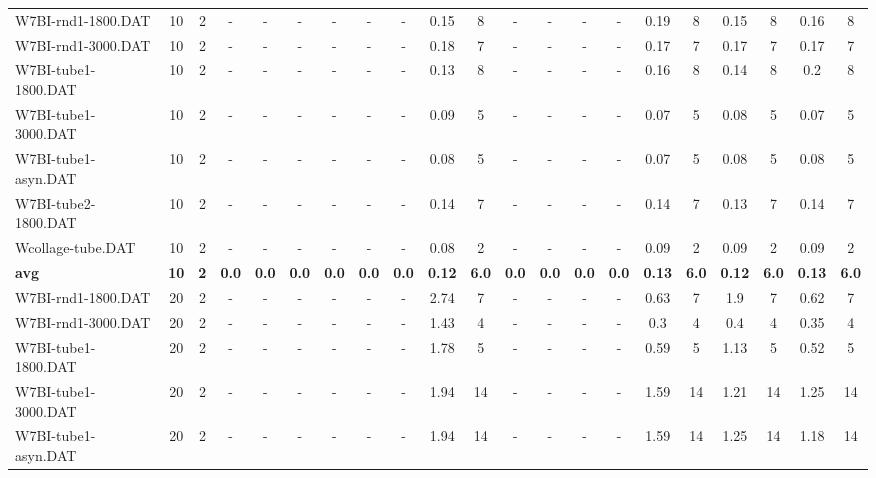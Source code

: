 \begin{sidewaystable}[!ht]
{\begin{tabular}{lcccccccccccccccccccc}
W7BI-rnd1-1800.DAT & 10 & 2 &  - &  - &  - &  - &  - &  - &  \textcolor{blue2}{0.15} & 8 &  - &  - &  - &  - & 0.19 & 8 &  \textcolor{blue2}{0.15} & 8 & 0.16 & 8 \\
W7BI-rnd1-3000.DAT & 10 & 2 &  - &  - &  - &  - &  - &  - & 0.18 & 7 &  - &  - &  - &  - &  \textcolor{blue2}{0.17} & 7 &  \textcolor{blue2}{0.17} & 7 &  \textcolor{blue2}{0.17} & 7 \\
W7BI-tube1-1800.DAT & 10 & 2 &  - &  - &  - &  - &  - &  - &  \textcolor{blue2}{0.13} & 8 &  - &  - &  - &  - & 0.16 & 8 & 0.14 & 8 & 0.2 & 8 \\
W7BI-tube1-3000.DAT & 10 & 2 &  - &  - &  - &  - &  - &  - & 0.09 & 5 &  - &  - &  - &  - &  \textcolor{blue2}{0.07} & 5 & 0.08 & 5 &  \textcolor{blue2}{0.07} & 5 \\
W7BI-tube1-asyn.DAT & 10 & 2 &  - &  - &  - &  - &  - &  - & 0.08 & 5 &  - &  - &  - &  - &  \textcolor{blue2}{0.07} & 5 & 0.08 & 5 & 0.08 & 5 \\
W7BI-tube2-1800.DAT & 10 & 2 &  - &  - &  - &  - &  - &  - & 0.14 & 7 &  - &  - &  - &  - & 0.14 & 7 &  \textcolor{blue2}{0.13} & 7 & 0.14 & 7 \\
Wcollage-tube.DAT & 10 & 2 &  - &  - &  - &  - &  - &  - &  \textcolor{blue2}{0.08} & 2 &  - &  - &  - &  - & 0.09 & 2 & 0.09 & 2 & 0.09 & 2 \\
\cline{1-21} \textbf{avg} & \textbf{10} & \textbf{2} & \textbf{0.0} & \textbf{0.0} & \textbf{0.0} & \textbf{0.0} & \textbf{0.0} & \textbf{0.0} & \textbf{0.12} & \textbf{6.0} & \textbf{0.0} & \textbf{0.0} & \textbf{0.0} & \textbf{0.0} & \textbf{0.13} & \textbf{6.0} & \textbf{0.12} & \textbf{6.0} & \textbf{0.13} & \textbf{6.0} \\ \cline{1-21}
W7BI-rnd1-1800.DAT & 20 & 2 &  - &  - &  - &  - &  - &  - & 2.74 & 7 &  - &  - &  - &  - & 0.63 & 7 & 1.9 & 7 &  \textcolor{blue2}{0.62} & 7 \\
W7BI-rnd1-3000.DAT & 20 & 2 &  - &  - &  - &  - &  - &  - & 1.43 & 4 &  - &  - &  - &  - &  \textcolor{blue2}{0.3} & 4 & 0.4 & 4 & 0.35 & 4 \\
W7BI-tube1-1800.DAT & 20 & 2 &  - &  - &  - &  - &  - &  - & 1.78 & 5 &  - &  - &  - &  - & 0.59 & 5 & 1.13 & 5 &  \textcolor{blue2}{0.52} & 5 \\
W7BI-tube1-3000.DAT & 20 & 2 &  - &  - &  - &  - &  - &  - & 1.94 & 14 &  - &  - &  - &  - & 1.59 & 14 &  \textcolor{blue2}{1.21} & 14 & 1.25 & 14 \\
W7BI-tube1-asyn.DAT & 20 & 2 &  - &  - &  - &  - &  - &  - & 1.94 & 14 &  - &  - &  - &  - & 1.59 & 14 & 1.25 & 14 &  \textcolor{blue2}{1.18} & 14 \\

\end{tabular}}
\end{sidewaystable}
